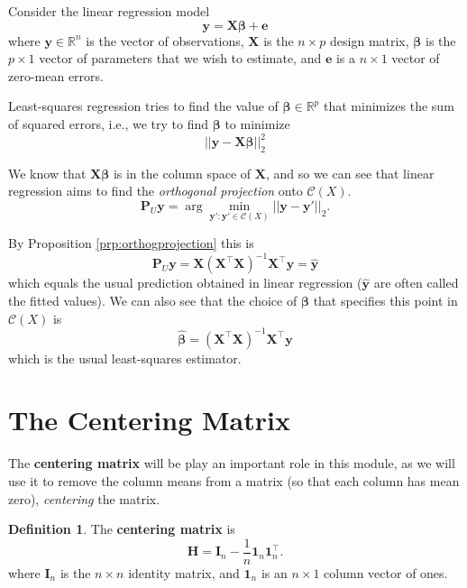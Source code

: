 \documentclass[
]{book}
\theoremstyle{definition}
\newtheorem{definition}{Definition}[chapter]
\theoremstyle{definition}
\theoremstyle{definition}
\theoremstyle{definition}
\theoremstyle{remark}
\begin{document}
Consider the linear regression model
\[\mathbf y= \mathbf X\boldsymbol \beta+\mathbf e\]
where \(\mathbf y\in\mathbb{R}^n\) is the vector of observations, \(\mathbf X\) is the \(n\times p\) design matrix, \(\boldsymbol \beta\) is the \(p\times 1\) vector of parameters that we wish to estimate, and \(\mathbf e\) is a \(n\times 1\) vector of zero-mean errors.

Least-squares regression tries to find the value of \(\boldsymbol \beta\in \mathbb{R}^p\) that minimizes the sum of squared errors, i.e., we try to find \(\boldsymbol \beta\) to minimize
\[||\mathbf y- \mathbf X\boldsymbol \beta||_2^2\]

We know that \(\mathbf X\boldsymbol \beta\) is in the column space of \(\mathbf X\), and so we can see that linear regression aims to find the \emph{orthogonal projection} onto \(\mathcal{C}(X)\).
\[\mathbf P_U\mathbf y=\arg \min_{\mathbf y': \mathbf y' \in \mathcal{C}(X)} ||\mathbf y-\mathbf y'||_2.\]

By Proposition \ref{prp:orthogprojection} this is
\[\mathbf P_U\mathbf y= \mathbf X(\mathbf X^\top \mathbf X)^{-1}\mathbf X^\top \mathbf y=\hat{\mathbf y}\]
which equals the usual prediction obtained in linear regression (\(\hat{\mathbf y}\) are often called the fitted values). We can also see that the choice of \(\boldsymbol \beta\) that specifies this point in \(\mathcal{C}(X)\) is
\[\hat{\boldsymbol \beta}=(\mathbf X^\top \mathbf X)^{-1}\mathbf X^\top \mathbf y\]
which is the usual least-squares estimator.

\hypertarget{centering-matrix}{%
\section{The Centering Matrix}\label{centering-matrix}}

The \textbf{centering matrix} will be play an important role in this module, as we will use it to remove the column means from a matrix (so that each column has mean zero), \emph{centering} the matrix.

\begin{definition}
\protect\hypertarget{def:centeringmatrix}{}{\label{def:centeringmatrix} } The \textbf{centering matrix} is
\begin{equation}
\mathbf H=\mathbf I_n - \frac{1}{n} {\mathbf 1}_n {\mathbf 1}_n^\top.
\label{eq:Hcentre}
\end{equation}
where \(\mathbf I_n\) is the \(n \times n\) identity matrix, and \({\mathbf 1}_n\) is an \(n \times 1\) column vector of ones.
\end{definition}
\end{document}
